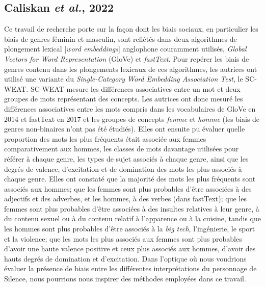 \documentclass[hidelinks, 11pt, letterpaper]{article}
\begin{document}
\subsection*{Caliskan \emph{et al.}, 2022}
Ce travail de recherche porte sur la façon dont les biais sociaux, en particulier les biais de genres féminin et masculin, sont reflétés dans deux algorithmes de plongement lexical [\emph{word embeddings}] anglophone couramment utilisés, \emph{Global Vectors for Word Representation} (GloVe) et \emph{fastText}. Pour repérer les biais de genres contenu dans les plongements lexicaux de ces algorithmes, les autrices ont utilisé une variante du \emph{Single-Category Word Embedding Association Test}, le SC-WEAT. SC-WEAT mesure les différences associatives entre un mot et deux groupes de mots représentant des concepts. Les autrices ont donc mesuré les différences associatives entre les mots compris dans les vocabulaires de GloVe en 2014 et fastText en 2017 et les groupes de concepts \emph{femme} et \emph{homme} (les biais de genres non-binaires n'ont pas été étudiés). Elles ont ensuite pu évaluer quelle proportion des mots les plus fréquents était associée aux femmes comparativement aux hommes, les classes de mots davantage utilisées pour référer à chaque genre, les types de sujet associés à chaque genre, ainsi que les degrés de valence, d'excitation et de domination des mots les plus associés à chaque genre. Elles ont constaté que la majorité des mots les plus fréquents sont associés aux hommes; que les femmes sont plus probables d'être associées à des adjectifs et des adverbes, et les hommes, à des verbes (dans fastText); que les femmes sont plus probables d'être associées à des insultes relatives à leur genre, à du contenu sexuel ou à du contenu relatif à l'apparence ou à la cuisine, tandis que les hommes sont plus probables d'être associés à la \emph{big tech}, l'ingénierie, le sport et la violence; que les mots les plus associés aux femmes sont plus probables d'avoir une haute valence positive et ceux plus associés aux hommes, d'avoir des hauts degrés de domination et d'excitation. Dans l'optique où nous voudrions évaluer la présence de biais entre les différentes interprétations du personnage de Silence, nous pourrions nous inspirer des méthodes employées dans ce travail.
\end{document}
